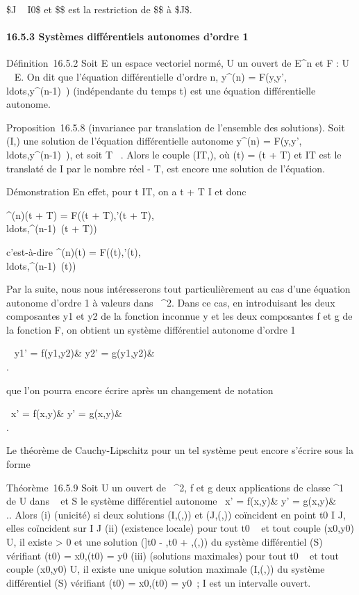 \text\$J \subset~ I0\$ et \$\psi\$ est la restriction
de \$\$ à \$J\$.

\paragraph{16.5.3 Systèmes différentiels autonomes d'ordre 1}

Définition~16.5.2 Soit E un espace vectoriel normé, U un ouvert de
E^n et F : U \rightarrow~ E. On dit que l'équation différentielle
d'ordre n, y^(n) =
F(y,y',\\ldots,y^(n-1)~)
(indépendante du temps t) est une équation différentielle autonome.

Proposition~16.5.8 (invariance par translation de l'ensemble des
solutions). Soit (I,\phi) une solution de l'équation différentielle
autonome y^(n) =
F(y,y',\\ldots,y^(n-1)~),
et soit T \in {}~. Alors le couple (IT,\phiT), où
\phiT(t) = \phi(t + T) et IT est le translaté de I par le
nombre réel - T, est encore une solution de l'équation.

Démonstration En effet, pour t \in IT, on a t + T \in I et donc

\phi^(n)(t + T) = F(\phi(t + T),\phi'(t +
T),\\ldots,\phi^(n-1)~(t
+ T))

c'est-à-dire \phiT^(n)(t) =
F(\phiT(t),\phiT'(t),\\ldots,\phiT^(n-1)~(t))

Par la suite, nous nous intéresserons tout particulièrement au cas d'une
équation autonome d'ordre 1 à valeurs dans ~^2. Dans ce cas,
en introduisant les deux composantes y1 et y2 de la
fonction inconnue y et les deux composantes f et g de la fonction F, on
obtient un système différentiel autonome d'ordre 1

\left \ \cases
y1' = f(y1,y2)& \cr
y2' = g(y1,y2)&\\ 
\right .

que l'on pourra encore écrire après un changement de notation

\left \ \cases x' =
f(x,y)& \cr y' = g(x,y)&\\  \right .

Le théorème de Cauchy-Lipschitz pour un tel système peut encore s'écrire
sous la forme

Théorème~16.5.9 Soit U un ouvert de ~^2, f et g deux
applications de classe ^1 de U dans ~ et S le système
différentiel autonome \left \
\cases x' = f(x,y)& \cr y' = g(x,y)&\\
 \right .. Alors (i) (unicité) si deux solutions
(I,(,)) et (J,(,))
coïncident en point t0 \in I \bigcap J, elles coïncident sur I \bigcap J
(ii) (existence locale) pour tout t0 \in \mathbb{R}~ et tout couple
(x0,y0) \in U, il existe \eta \textgreater{} 0 et une
solution ({]}t0 - \eta,t0 + \eta{[},(\phi,\psi)) du système
différentiel (S) vérifiant \phi(t0) =
x0,\psi(t0) = y0 (iii) (solutions maximales)
pour tout t0 \in {}~ et tout couple (x0,y0) \in
U, il existe une unique solution maximale (I,(\phi,\psi)) du système
différentiel (S) vérifiant \phi(t0) =
x0,\psi(t0) = y0~; I est un intervalle
ouvert.

